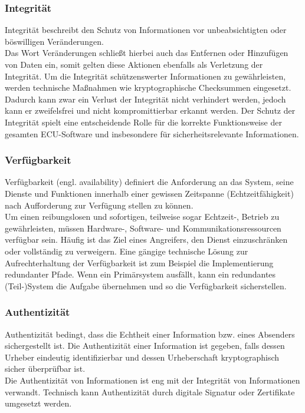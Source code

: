\subsubsection{Integrität}
\glqq Integrität beschreibt den Schutz von Informationen vor unbeabsichtigten oder böswilligen Veränderungen.
\grqq{} \cite[7]{Wurm.2022} \\
Das Wort Veränderungen schließt hierbei auch das Entfernen oder Hinzufügen von Daten ein, somit gelten diese Aktionen ebenfalls als Verletzung der Integrität.
Um die Integrität schützenswerter Informationen zu gewährleisten, werden technische Maßnahmen wie kryptographische Checksummen eingesetzt. Dadurch kann zwar ein Verlust der Integrität nicht verhindert werden, jedoch kann er zweifelsfrei und nicht kompromittierbar erkannt werden. Der Schutz der Integrität spielt eine entscheidende Rolle für die korrekte Funktionsweise der gesamten ECU-Software und insbesondere für sicherheitsrelevante Informationen.

\subsubsection{Verfügbarkeit}
\glqq Verfügbarkeit (engl. availability) definiert die Anforderung an das System, seine Dienste und Funktionen innerhalb einer gewissen Zeitspanne (Echtzeitfähigkeit) nach Aufforderung zur Verfügung stellen zu können.
\grqq{} \cite[7]{Wurm.2022} \\
Um einen reibungslosen und sofortigen, teilweise sogar Echtzeit-, Betrieb zu gewährleisten, müssen Hardware-, Software- und Kommunikationsressourcen verfügbar sein. Häufig ist das Ziel eines Angreifers, den Dienst einzuschränken oder vollständig zu verweigern. Eine gängige technische Lösung zur Aufrechterhaltung der Verfügbarkeit ist zum Beispiel die Implementierung redundanter Pfade. Wenn ein Primärsystem ausfällt, kann ein redundantes (Teil-)System die Aufgabe übernehmen und so die Verfügbarkeit sicherstellen.

\subsubsection{Authentizität}
\glqq  Authentizität bedingt, dass die Echtheit einer Information bzw. eines Absenders sichergestellt ist. Die Authentizität einer Information ist gegeben, falls dessen Urheber eindeutig identifizierbar und dessen Urheberschaft kryptographisch sicher überprüfbar ist.
\grqq{} \cite[7]{Wurm.2022} \\
Die Authentizität von Informationen ist eng mit der Integrität von Informationen verwandt. Technisch kann Authentizität durch digitale Signatur oder Zertifikate umgesetzt werden.


